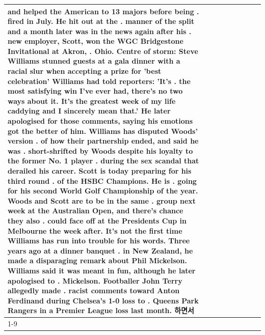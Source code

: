 \begin{table}[H]
\begin{tabular}{lllrlllll}
and helped the American to 13 majors before being . fired in July. He hit out at the . manner of the split and a month later was in the news again after his . new employer, Scott, won the WGC Bridgestone Invitational at Akron, . Ohio. Centre of storm: Steve Williams stunned guests at a gala dinner with a racial slur when accepting a prize for 'best celebration' Williams had told reporters: 'It's . the most satisfying win I've ever had, there's no two ways about it. It's the greatest week of my life caddying and I sincerely mean that.' He later apologised for those comments, saying his emotions got the better of him. Williams has disputed Woods' version . of how their partnership ended, and said he was . short-shrifted by Woods despite his loyalty to the former No. 1 player . during the sex scandal that derailed his career. Scott is today preparing for his third round . of the HSBC Champions. He is . going for his second World Golf Championship of the year. Woods and Scott are to be in the same . group next week at the Australian Open, and there's chance they also . could face off at the Presidents Cup in Melbourne the week after. It's not the first time Williams has run into trouble for his words. Three years ago at a dinner banquet . in New Zealand, he made a disparaging remark about Phil Mickelson. Williams said it was meant in fun, although he later apologised to . Mickelson. Footballer John Terry allegedly made . racist comments toward Anton Ferdinand during Chelsea's 1-0 loss to . Queens Park Rangers in a Premier League loss last month. 하면서 \\
\cline{1-9}
\bottomrule
\end{tabular}
\end{table}
